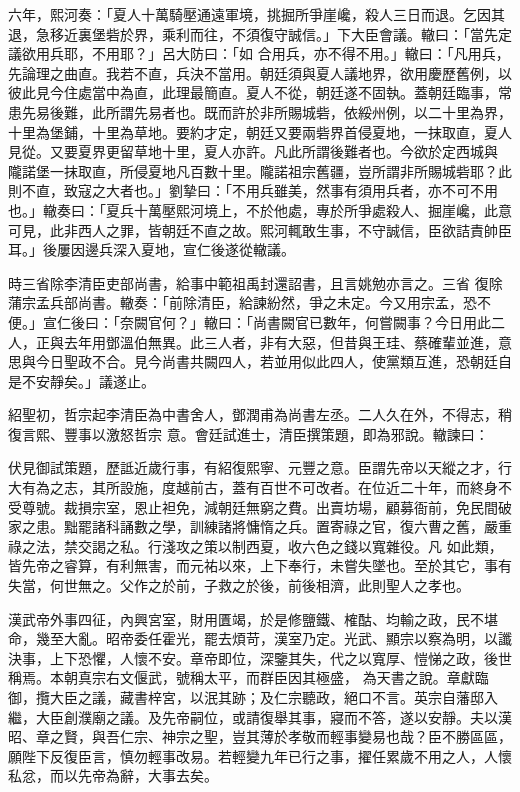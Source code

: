 \begin{pinyinscope}
 六年，熙河奏：「夏人十萬騎壓通遠軍境，挑掘所爭崖巉，殺人三日而退。乞因其退，急移近裏堡砦於界，乘利而往，不須復守誠信。」下大臣會議。轍曰：「當先定議欲用兵耶，不用耶？」呂大防曰：「如
 合用兵，亦不得不用。」轍曰：「凡用兵，先論理之曲直。我若不直，兵決不當用。朝廷須與夏人議地界，欲用慶歷舊例，以彼此見今住處當中為直，此理最簡直。夏人不從，朝廷遂不固執。蓋朝廷臨事，常患先易後難，此所謂先易者也。既而許於非所賜城砦，依綏州例，以二十里為界，十里為堡鋪，十里為草地。要約才定，朝廷又要兩砦界首侵夏地，一抹取直，夏人見從。又要夏界更留草地十里，夏人亦許。凡此所謂後難者也。今欲於定西城與
 隴諾堡一抹取直，所侵夏地凡百數十里。隴諾祖宗舊疆，豈所謂非所賜城砦耶？此則不直，致寇之大者也。」劉摯曰：「不用兵雖美，然事有須用兵者，亦不可不用也。」轍奏曰：「夏兵十萬壓熙河境上，不於他處，專於所爭處殺人、掘崖巉，此意可見，此非西人之罪，皆朝廷不直之故。熙河輒敢生事，不守誠信，臣欲詰責帥臣耳。」後屢因邊兵深入夏地，宣仁後遂從轍議。



 時三省除李清臣吏部尚書，給事中範祖禹封還詔書，且言姚勉亦言之。三省
 復除蒲宗孟兵部尚書。轍奏：「前除清臣，給諫紛然，爭之未定。今又用宗孟，恐不便。」宣仁後曰：「奈闕官何？」轍曰：「尚書闕官已數年，何嘗闕事？今日用此二人，正與去年用鄧溫伯無異。此三人者，非有大惡，但昔與王珪、蔡確輩並進，意思與今日聖政不合。見今尚書共闕四人，若並用似此四人，使黨類互進，恐朝廷自是不安靜矣。」議遂止。



 紹聖初，哲宗起李清臣為中書舍人，鄧潤甫為尚書左丞。二人久在外，不得志，稍復言熙、豐事以激怒哲宗
 意。會廷試進士，清臣撰策題，即為邪說。轍諫曰：



 伏見御試策題，歷詆近歲行事，有紹復熙寧、元豐之意。臣謂先帝以天縱之才，行大有為之志，其所設施，度越前古，蓋有百世不可改者。在位近二十年，而終身不受尊號。裁損宗室，恩止袒免，減朝廷無窮之費。出賣坊場，顧募衙前，免民間破家之患。黜罷諸科誦數之學，訓練諸將慵惰之兵。置寄祿之官，復六曹之舊，嚴重祿之法，禁交謁之私。行淺攻之策以制西夏，收六色之錢以寬雜役。凡
 如此類，皆先帝之睿算，有利無害，而元祐以來，上下奉行，未嘗失墜也。至於其它，事有失當，何世無之。父作之於前，子救之於後，前後相濟，此則聖人之孝也。



 漢武帝外事四征，內興宮室，財用匱竭，於是修鹽鐵、榷酤、均輸之政，民不堪命，幾至大亂。昭帝委任霍光，罷去煩苛，漢室乃定。光武、顯宗以察為明，以讖決事，上下恐懼，人懷不安。章帝即位，深鑒其失，代之以寬厚、愷悌之政，後世稱焉。本朝真宗右文偃武，號稱太平，而群臣因其極盛，
 為天書之說。章獻臨御，攬大臣之議，藏書梓宮，以泯其跡；及仁宗聽政，絕口不言。英宗自藩邸入繼，大臣創濮廟之議。及先帝嗣位，或請復舉其事，寢而不答，遂以安靜。夫以漢昭、章之賢，與吾仁宗、神宗之聖，豈其薄於孝敬而輕事變易也哉？臣不勝區區，願陛下反復臣言，慎勿輕事改易。若輕變九年已行之事，擢任累歲不用之人，人懷私忿，而以先帝為辭，大事去矣。




\end{pinyinscope}
